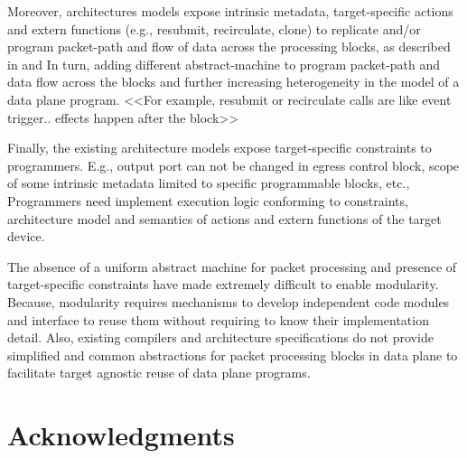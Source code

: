 \documentclass{hotnets19}
\begin{document}
Moreover, architectures models expose intrinsic metadata, target-specific actions and extern functions (e.g., resubmit, recirculate, clone) to replicate and/or program packet-path and flow of data across the processing blocks, as described in \cite{simple_switch.md} and  \cite{psa}
In turn, adding different abstract-machine to program packet-path and data flow across the blocks and further increasing heterogeneity in the model of a data plane program.
<<For example, resubmit or recirculate calls are like event trigger.. effects happen after the block>>

Finally, the existing architecture models expose target-spe\-cific constraints to programmers.
E.g., output port can not be changed in egress control block, scope of some intrinsic metadata limited to specific programmable blocks, etc.,  
Programmers need implement execution logic conforming to constraints, architecture model and semantics of actions and extern functions of the target device.



The absence of a uniform abstract machine for packet processing and presence of target-specific constraints have made extremely difficult to enable modularity.
Because, modularity requires mechanisms to develop independent code modules and interface to reuse them without requiring to know their implementation detail.
Also, existing compilers and architecture specifications do not provide simplified and common abstractions for packet processing blocks in data plane to facilitate target agnostic reuse of data plane programs.










\section*{Acknowledgments}

 
\begin{small}

\end{small}
\end{document}
